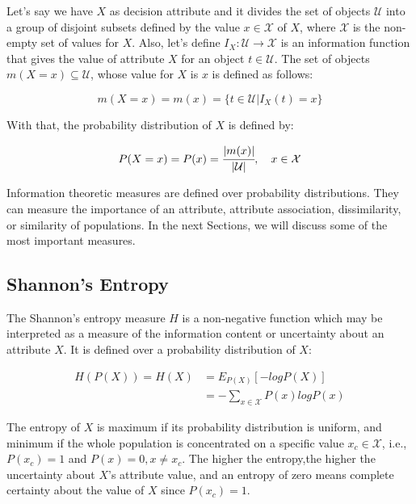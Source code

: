 Let's say we have $X$ as decision attribute and it divides the set of objects $\mathcal{U}$ into a group of disjoint
subsets defined by the value $x \in \mathcal{X}$ of $X$, where $\mathcal{X}$ is the non-empty set of values for
$X$. Also, let's define $I_X : \mathcal{U} \rightarrow \mathcal{X}$ is an information function that gives the value of
attribute $X$ for an object $t \in \mathcal{U}$. The set of objects $m(X=x) \subseteq \mathcal{U}$, whose value for
$X$
is $x$ is defined as follows:

\begin{equation}
 m(X=x)=m(x)=\{t \in \mathcal{U} | I_X(t)=x\}
\end{equation}

With that, the probability distribution of $X$ is defined by:

\begin{equation}
 P(X=x)=P(x)=\cfrac{|m(x)|}{|\mathcal{U}|},\quad x \in \mathcal{X}
\end{equation}

Information theoretic measures are defined over probability distributions. They can measure the importance of an
attribute, attribute association, dissimilarity, or similarity of populations. In the next Sections, we will
discuss some of the most important measures.

\subsection{Shannon's Entropy}

The Shannon's entropy measure $H$ is a non-negative function which may be interpreted as a measure of the information
content or uncertainty about an attribute $X$. It is defined over a probability distribution of $X$:

\begin{equation}
\begin{split}
 H(P(X))=H(X)&=E_{P(X)}[-logP(X)] \\
 &=-\sum_{x \in \mathcal{X}}P(x)logP(x)
\end{split} 
\end{equation}

The entropy of $X$ is maximum if its probability distribution is uniform, and minimum if the whole population is
concentrated on a specific value $x_c \in \mathcal{X}$, i.e., $P(x_c)=1$ and $P(x)=0, x \neq x_c$. The higher the
entropy,the higher the uncertainty about $X$'s attribute value, and an entropy of zero means complete certainty about
the value of $X$ since $P(x_c)=1$.

